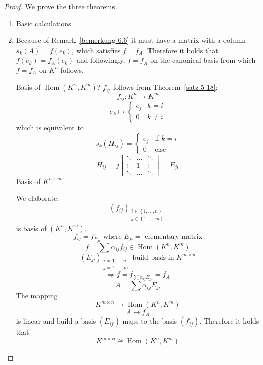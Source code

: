 \documentclass[a4paper,landscape,twocolumn]{article}
\newcommand\set[1]{\left\{#1\right\}}
\DeclareMathOperator\Hom{Hom} %
\begin{document}
\begin{proof}
  We prove the three theorems.
  \begin{enumerate}
    \item Basic calculations.
    \item Because of Remark~\ref{bemerkung-6.6} it must have a matrix with a
      column $s_k(A) = f(e_k)$, which satisfies $f = f_A$.
      Therefore it holds that $f(e_k) = f_A(e_k)$ and followingly,
      $f = f_A$ on the canonical basis from which $f = f_A$ on $K^n$ follows.

      Basis of $\Hom(K^n, K^m)$?
      $f_{ij}$ follows from Theorem~\ref{satz-5-18}:
      \[ f_{ij}: K^n \rightarrow K^m \]
      \[
        e_k \mapsto \begin{cases}
          e_j & k=i \\
          0 & k \neq i
        \end{cases}
      \]
      which is equivalent to
      \[
        s_k(H_{ij}) = \begin{cases}
          e_j & \text{if } k = i \\
          0 & \text{else}
        \end{cases}
      \]
      \[
        H_{ij} = j \begin{bmatrix}
          \ddots & \ldots & \ddots \\
          \vdots & 1 & \vdots \\
          \ddots & \ldots & \ddots
        \end{bmatrix} = E_{ji}
      \]
      Basis of $K^{n\times m}$.

      We elaborate:
      \[ (f_{ij})_{\substack{i \in \set{1, \ldots, n} \\ j \in \set{1, \ldots, m}}} \]
      is basis of $(K^n, K^m)$.
      \[ f_{ij} = f_{E_{ji}} \text{ where } E_{ji} = \text{ elementary matrix} \]
      \[ f = \sum \alpha_{ij} f_{ij} \in \Hom(K^n, K^m) \]
      \[ (E_{ji})_{\substack{i = 1,\ldots,n \\ j = 1,\ldots,m}} \text{ build basis in } K^{m \times n} \]
      \[ \Rightarrow f = f_{\sum \alpha_{ij} E_{ji}} = f_A \]
      \[ A = \sum \alpha_{ij} E_{ji} \]
      The mapping
      \[ K^{m\times n} \rightarrow \Hom(K^n, K^m) \]
      \[ A \rightarrow f_A \]
      is linear and build a basis $(E_{ij})$ maps to the basis $(f_{ij})$.
      Therefore it holds that
      \[ K^{m\times n} \cong \Hom(K^n, K^m) \]
  \end{enumerate}
\end{proof}
\end{document}
